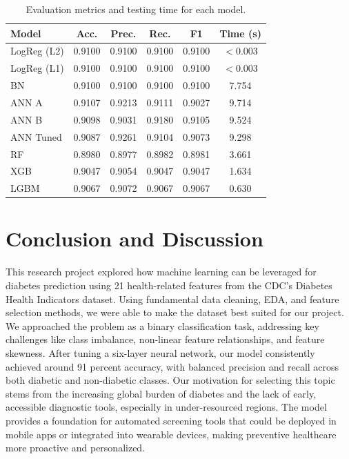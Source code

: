 \documentclass[conference]{IEEEtran}
\begin{document}
\begin{table}[H]
\centering
\caption{Evaluation metrics and testing time for each model.}
\label{tab:performance_metrics}
\renewcommand{\arraystretch}{1.2}
\begin{tabular}{|l|c|c|c|c|c|}
\hline
\textbf{Model} & \textbf{Acc.} & \textbf{Prec.} & \textbf{Rec.} & \textbf{F1} & \textbf{Time (s)} \\
\hline
LogReg (L2) & 0.9100 & 0.9100 & 0.9100 & 0.9100 & $<$0.003 \\
LogReg (L1) & 0.9100 & 0.9100 & 0.9100 & 0.9100 & $<$0.003 \\
BN          & 0.9100 & 0.9100 & 0.9100 & 0.9100 & 7.754 \\
ANN A       & 0.9107 & 0.9213 & 0.9111 & 0.9027 & 9.714 \\
ANN B       & 0.9098 & 0.9031 & 0.9180 & 0.9105 & 9.524 \\
ANN Tuned   & 0.9087 & 0.9261 & 0.9104 & 0.9073 & 9.298 \\
RF          & 0.8980 & 0.8977 & 0.8982 & 0.8981 & 3.661 \\
XGB         & 0.9047 & 0.9054 & 0.9047 & 0.9047 & 1.634 \\
LGBM        & 0.9067 & 0.9072 & 0.9067 & 0.9067 & 0.630 \\
\hline
\end{tabular}
\end{table}



\section{Conclusion and Discussion}
This research project explored how machine learning can be leveraged for diabetes prediction using 21 health-related features from the CDC's Diabetes Health Indicators dataset. Using fundamental data cleaning, EDA, and feature selection methods, we were able to make the dataset best suited for our project. We approached the problem as a binary classification task, addressing key challenges like class imbalance, non-linear feature relationships, and feature skewness. After tuning a six-layer neural network, our model consistently achieved around 91 percent accuracy, with balanced precision and recall across both diabetic and non-diabetic classes. Our motivation for selecting this topic stems from the increasing global burden of diabetes and the lack of early, accessible diagnostic tools, especially in under-resourced regions. The model provides a foundation for automated screening tools that could be deployed in mobile apps or integrated into wearable devices, making preventive healthcare more proactive and personalized. \\
\end{document}
